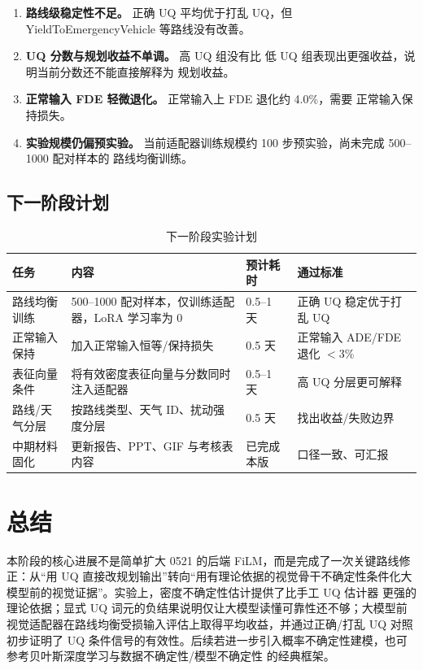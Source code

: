 \documentclass[12pt, a4paper]{ctexart}
\begin{document}
\begin{riskbox}[主要问题]
\begin{enumerate}[leftmargin=2em]
    \item \textbf{路线级稳定性不足。} 正确 UQ 平均优于打乱 UQ，但 YieldToEmergencyVehicle 等路线没有改善。
    \item \textbf{UQ 分数与规划收益不单调。} 高 UQ 组没有比 低 UQ 组表现出更强收益，说明当前分数还不能直接解释为 规划收益。
    \item \textbf{正常输入 FDE 轻微退化。} 正常输入上 FDE 退化约 4.0\%，需要 正常输入保持损失。
    \item \textbf{实验规模仍偏预实验。} 当前适配器训练规模约 100 步预实验，尚未完成 500--1000 配对样本的 路线均衡训练。
\end{enumerate}
\end{riskbox}

\subsection{下一阶段计划}

\begin{table}[H]
\centering
\caption{下一阶段实验计划}
\small
\begin{tabular}{p{2.8cm}p{4.8cm}p{2.8cm}p{2.2cm}}
\toprule
\textbf{任务} & \textbf{内容} & \textbf{预计耗时} & \textbf{通过标准} \\
\midrule
路线均衡训练 & 500--1000 配对样本，仅训练适配器，LoRA 学习率为 0 & 0.5--1 天 & 正确 UQ 稳定优于打乱 UQ \\
正常输入保持 & 加入正常输入恒等/保持损失 & 0.5 天 & 正常输入 ADE/FDE 退化 $<3\%$ \\
表征向量条件 & 将有效密度表征向量与分数同时注入适配器 & 0.5--1 天 & 高 UQ 分层更可解释 \\
路线/天气分层 & 按路线类型、天气 ID、扰动强度分层 & 0.5 天 & 找出收益/失败边界 \\
中期材料固化 & 更新报告、PPT、GIF 与考核表内容 & 已完成本版 & 口径一致、可汇报 \\
\bottomrule
\end{tabular}
\end{table}

\section{总结}

本阶段的核心进展不是简单扩大 0521 的后端 FiLM，而是完成了一次关键路线修正：从“用 UQ 直接改规划输出”转向“用有理论依据的视觉骨干不确定性条件化大模型前的视觉证据”。实验上，密度不确定性估计提供了比手工 UQ 估计器 更强的理论依据；显式 UQ 词元的负结果说明仅让大模型读懂可靠性还不够；大模型前视觉适配器在路线均衡受损输入评估上取得平均收益，并通过正确/打乱 UQ 对照初步证明了 UQ 条件信号的有效性。后续若进一步引入概率不确定性建模，也可参考贝叶斯深度学习与数据不确定性/模型不确定性 的经典框架\cite{gal2016dropout,kendall2017uncertainties}。
\end{document}
